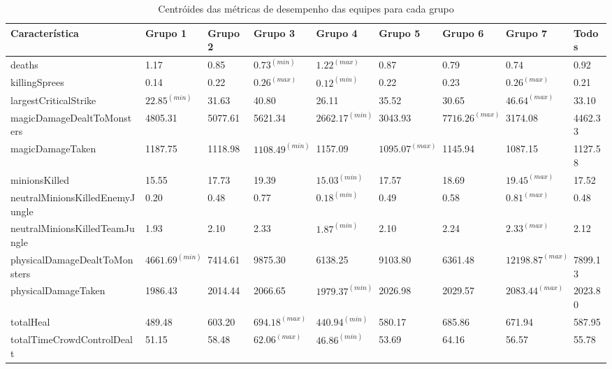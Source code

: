 \begin{table}
  \tiny
  \caption{Centróides das métricas de desempenho das equipes para cada grupo}
  \label{tab:centers}
  \begin{tabular}{lp{}p{}p{}p{}p{}p{}p{}p{}}
  \toprule
Característica&                   Grupo 1&      Grupo 2&      Grupo 3&      Grupo 4&      Grupo 5&      Grupo 6&        Grupo 7&     Todos\\
  \midrule
deaths&                             1.17&    0.85&    $0.73^{(min)}$&    $1.22^{(max)}$&    0.87&    0.79&     0.74&    0.92\\ \hline
killingSprees&                      0.14&    0.22&    $0.26^{(max)}$&    $0.12^{(min)}$&    0.22&    0.23&     $0.26^{(max)}$&    0.21\\ \hline
largestCriticalStrike&             $22.85^{(min)}$&   31.63&   40.80&   26.11&   35.52&   30.65&    $46.64^{(max)}$&   33.10\\ \hline
magicDamageDealtToMonsters&      4805.31& 5077.61& 5621.34& $2662.17^{(min)}$& 3043.93& $7716.26^{(max)}$&  3174.08& 4462.33\\ \hline
magicDamageTaken&                1187.75& 1118.98& $1108.49^{(min)}$& 1157.09& $1095.07^{(max)}$& 1145.94&  1087.15& 1127.58\\ \hline
minionsKilled&                     15.55&   17.73&   19.39&   $15.03^{(min)}$&   17.57&   18.69&    $19.45^{(max)}$&   17.52\\ \hline
neutralMinionsKilledEnemyJungle&    0.20&    0.48&    0.77&    $0.18^{(min)}$&    0.49&    0.58&     $0.81^{(max)}$&    0.48\\ \hline
neutralMinionsKilledTeamJungle&     1.93&    2.10&    2.33&    $1.87^{(min)}$&    2.10&    2.24&     $2.33^{(max)}$&    2.12\\ \hline
physicalDamageDealtToMonsters&   $4661.69^{(min)}$& 7414.61& 9875.30& 6138.25& 9103.80& 6361.48& $12198.87^{(max)}$& 7899.13\\ \hline
physicalDamageTaken&             1986.43& 2014.44& 2066.65& $1979.37^{(min)}$& 2026.98& 2029.57&  $2083.44^{(max)}$& 2023.80\\ \hline
totalHeal&                        489.48&  603.20&  $694.18^{(max)}$&  $440.94^{(min)}$&  580.17&  685.86&   671.94&  587.95\\ \hline
totalTimeCrowdControlDealt&        51.15&   58.48&   $62.06^{(max)}$&   $46.86^{(min)}$&   53.69&   64.16&    56.57&   55.78\\ \hline

\end{tabular}
\end{table}
